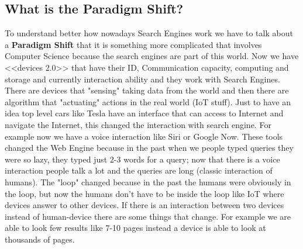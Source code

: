 \subsection{What is the Paradigm Shift?}
To understand better how nowadays Search Engines work we have to talk about a \textbf{Paradigm Shift} that it is something more complicated that involves Computer Science because the search engines are part of this world.
Now we have <<devices 2.0>> that have their ID, Communication capacity, computing and storage and currently interaction ability and they work with Search Engines.
There are devices that "sensing" taking data from the world and then there are algorithm that "actuating" actions in the real world (IoT stuff).
Just to have an idea top level cars like Tesla have an interface that can access to Internet and navigate the Internet, this changed the interaction with search engine. For example now we have a voice interaction like Siri or Google Now. These tools changed the Web Engine because in the past when we people typed queries they were so lazy, they typed just 2-3 words for a query; now that there is a voice interaction people talk a lot and the queries are long (classic interaction of humans).
The "loop" changed because in the past the humans were obviously in the loop, but now the humans don't have to be inside the loop like IoT where devices answer to other devices.
If there is an interaction between two devices instead of human-device there are some things that change. For example we are able to look few results like 7-10 pages instead a device is able to look at thousands of pages.\newline
